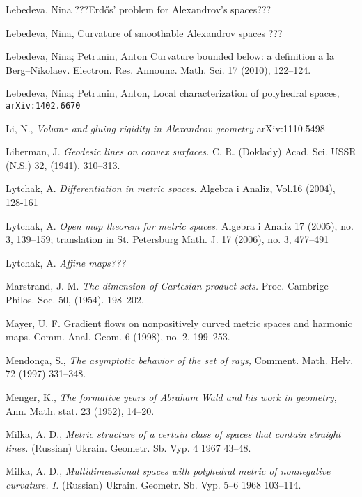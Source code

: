 \begin{thebibliography}{52}
 Lebedeva, Nina ???Erd\H{o}s' problem for Alexandrov's spaces???

 Lebedeva, Nina, Curvature of smoothable Alexandrov spaces ??? 

 Lebedeva, Nina; Petrunin, Anton 
Curvature bounded below: a definition a la Berg--Nikolaev. 
Electron. Res. Announc. Math. Sci. 17 (2010), 122--124.

 Lebedeva, Nina; Petrunin, Anton, 
Local characterization of polyhedral spaces,
{\tt arXiv:1402.6670}

Li, N.,
\textit{Volume and gluing rigidity in Alexandrov geometry}
arXiv:1110.5498

Liberman, J. \textit{Geodesic lines on convex surfaces.}  C. R.
(Doklady) Acad. Sci. USSR (N.S.)  32,  (1941). 310--313.

Lytchak, A. \textit{Differentiation in metric spaces.}  Algebra i Analiz, Vol.16 (2004), 128-161 

Lytchak, A. \textit{Open map theorem for metric spaces.}  Algebra i Analiz  17  (2005),  no. 3, 139--159;  translation in  St. Petersburg Math. J.  17  (2006),  no. 3, 477--491 

 Lytchak, A. \textit{Affine maps???}

 Marstrand, J. M. \textit{The dimension of Cartesian product sets.}
Proc. Cambrige Philos. Soc. 50, (1954). 198--202.

 Mayer, U. F. Gradient flows on nonpositively curved metric spaces and harmonic maps. Comm. Anal. Geom. 6 (1998), no. 2, 199--253.

Mendon\c{c}a, S., \textit{The asymptotic behavior of the set of rays,} Comment. Math. Helv. 72 (1997) 331--348.


 Menger, K., \textit{The formative years of Abraham Wald and his work in geometry}, Ann. Math. stat. 23 (1952), 14--20.


Milka, A. D., \textit{Metric structure of a certain class of spaces that contain straight lines.} (Russian) Ukrain. Geometr. Sb. Vyp.  4  1967 43--48.

Milka, A. D., \textit{Multidimensional spaces with polyhedral metric of nonnegative curvature. I.}  (Russian)  Ukrain. Geometr. Sb. Vyp.  5--6 
1968 103--114. 


\end{thebibliography}
